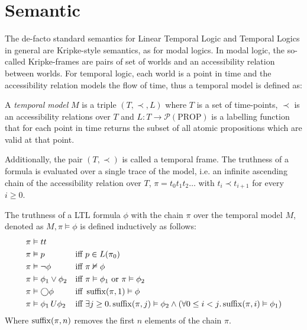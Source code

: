 \section{Semantic}

The de-facto standard semantics for Linear Temporal Logic and Temporal Logics in general are Kripke-style semantics, as
for modal logics. In modal logic, the so-called Kripke-frames are pairs of set of worlds and an accessibility relation
between worlds. For temporal logic, each world is a point in time and the accessibility relation models the flow of
time, thus a temporal model is defined as:

\begin{definition}
  A \emph{temporal model} $M$ is a triple $(T, \prec, L)$ where $T$ is a set of time-points, $\prec$ is an accessibility
  relations over $T$ and $L : T \to \mathcal{P}(\text{PROP})$ is a labelling function that for each point in time
  returns the subset of all atomic propositions which are valid at that point.
\end{definition}

Additionally, the pair $(T, \prec)$ is called a temporal frame. The truthness of a formula is evaluated over a single
trace of the model, i.e. an infinite ascending chain of the accessibility relation over $T$,
$\pi = t_0t_1t_2\ldots$ with $t_i \prec t_{i+1}$ for every $i \geq 0$.

\begin{definition}
  The truthness of a LTL formula $\phi$ with the chain $\pi$ over the temporal model $M$, denoted as
  $M, \pi \vDash \phi$ is defined inductively as follows:
  \begin{align*}
    \pi &\vDash tt && \\
    \pi &\vDash p &&\text{iff } p \in L(\pi_0) \\
    \pi &\vDash \neg\phi &&\text{iff } \pi \nvDash \phi \\
    \pi &\vDash \phi_1 \lor \phi_2 &&\text{iff } \pi \vDash \phi_1 \text{ or } \pi \vDash \phi_2 \\
    \pi &\vDash \bigcirc{\phi} &&\text{iff } \operatorname{suffix}(\pi, 1) \vDash \phi \\
    \pi &\vDash {\phi_1}\,U {\phi_2} &&\text{iff } \exists {j \geq 0} \ldotp {\operatorname{suffix}(\pi, j) \vDash \phi_2 \land
      (\forall {0 \leq i < j} \ldotp {\operatorname{suffix}(\pi, i) \vDash \phi_1})}
  \end{align*}
  Where $\operatorname{suffix}(\pi, n)$ removes the first $n$ elements of the chain $\pi$.
\end{definition}

